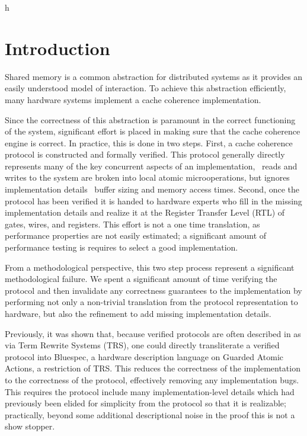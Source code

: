 h\section{Introduction}
\label{sec:Introduction}

Shared memory is a common abstraction for distributed systems as it
provides an easily understood model of interaction. To achieve this
abstraction efficiently, many hardware systems implement a cache
coherence implementation. 

Since the correctness of this abstraction is paramount in the correct
functioning of the system, significant effort is placed in making sure
that the cache coherence engine is correct. In practice, this is done
in two steps. First, a cache coherence protocol is constructed and
formally verified. This protocol generally directly represents many of
the key concurrent aspects of an implementation, \eg\ reads and
writes to the system are broken into local atomic microoperations, but
ignores implementation details \eg\ buffer sizing and memory access
times. Second, once the protocol has been verified it is handed to
hardware experts who fill in the missing implementation details and
realize it at the Register Transfer Level (RTL) of gates, wires, and
registers. This effort is not a one time translation, as performance
properties are not easily estimated; a significant amount of
performance testing is requires to select a good implementation. 

From a methodological perspective, this two step process represent a
significant methodological failure. We spent a significant amount of
time verifying the protocol and then invalidate any correctness
guarantees to the implementation by performing not only a non-trivial
translation from the protocol representation to hardware, but also
the refinement to add missing implementation details.

Previously, it was shown that, because verified protocols are often
described in as via Term Rewrite Systems (TRS), one could directly
transliterate a verified protocol into Bluespec, a hardware
description language on Guarded Atomic Actions, a restriction of
TRS. This reduces the correctness of the implementation to the
correctness of the protocol, effectively removing any implementation
bugs. This requires the protocol include many implementation-level
details which had previously been elided for simplicity from the
protocol so that it is realizable; practically, beyond some additional
descriptional noise in the proof this is not a show stopper.

